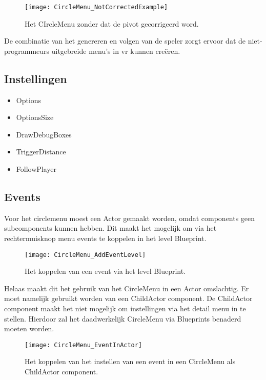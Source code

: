 \begin{figure}[!ht]
  \centering
    \texttt{[image: CircleMenu\_NotCorrectedExample]}
    \caption{Het CIrcleMenu zonder dat de pivot gecorrigeerd word.}
\end{figure}

De combinatie van het genereren en volgen van de speler zorgt ervoor dat de niet-programmeurs uitgebreide menu's in \gls{vr} kunnen creëren.

\subsection{Instellingen}
\begin{itemize}
	\item Options
	\item OptionsSize
	\item DrawDebugBoxes
	\item TriggerDistance
	\item FollowPlayer
\end{itemize}

\subsection{Events}
Voor het circlemenu moest een Actor gemaakt worden, omdat components geen subcomponents kunnen hebben. Dit maakt het mogelijk om via het rechtermuisknop menu events te koppelen in het level Blueprint.

\begin{figure}[!ht]
  \centering
    \texttt{[image: CircleMenu\_AddEventLevel]}
    \caption{Het koppelen van een event via het level Blueprint.}
\end{figure}

Helaas maakt dit het gebruik van het CircleMenu in een Actor omslachtig. Er moet namelijk gebruikt worden van een ChildActor component. De ChildActor component maakt het niet mogelijk om instellingen via het detail menu in te stellen. Hierdoor zal het daadwerkelijk CircleMenu via Blueprints benaderd moeten worden.

\begin{figure}[H]
  \centering
    \texttt{[image: CircleMenu\_EventInActor]}
    \caption{Het koppelen van het instellen van een event in een CircleMenu als ChildActor component.}
\end{figure}

